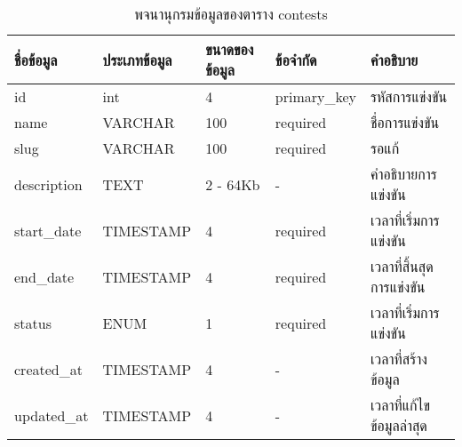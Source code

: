 \begin{table}[H]
    \caption{พจนานุกรมข้อมูลของตาราง contests}
    \label{tab:database-contests}
    \begin{tabularx}{\textwidth}{ | p{2.25cm} | p{2.20cm} | p{2.45cm} | p{2cm} | X | }
    \hline
    \textbf{ชื่อข้อมูล} & \textbf{ประเภทข้อมูล} & \textbf{ขนาดของข้อมูล} & \textbf{ข้อจำกัด} & \textbf{คำอธิบาย} \\
    \hline
    id & int & 4 & primary\_key & รหัสการแข่งขัน \\
    \hline
    name & VARCHAR & 100 & required & ชื่อการแข่งขัน \\
    \hline
    slug & VARCHAR & 100 & required & รอแก้ \\
    \hline
    description & TEXT & 2 - 64Kb & - & คำอธิบายการแข่งขัน \\
    \hline
    start\_date & TIMESTAMP & 4 & required & เวลาที่เริ่มการแข่งขัน \\
    \hline
    end\_date & TIMESTAMP & 4 & required & เวลาที่สิ้นสุดการแข่งขัน \\
    \hline
    status & ENUM & 1 & required  & เวลาที่เริ่มการแข่งขัน \\
    \hline
    created\_at & TIMESTAMP & 4 & - & เวลาที่สร้างข้อมูล \\
    \hline
    updated\_at & TIMESTAMP & 4 & - & เวลาที่แก้ไขข้อมูลล่าสุด \\
    \hline
    \end{tabularx}
\end{table}
